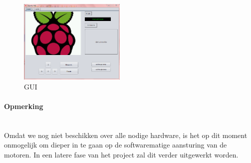 \documentclass{peno-opdracht2}
\begin{document}
\begin{figure}[ht!]
\centering
\includegraphics[height=40mm]{GUI.png}
\caption{GUI}
\label{GUI}
\end{figure}


\paragraph{Opmerking} ~\\
Omdat we nog niet beschikken over alle nodige hardware, is het op dit moment onmogelijk om dieper in te gaan op de softwarematige aansturing van de motoren. In een latere fase van het project zal dit verder uitgewerkt worden.
\end{document}
